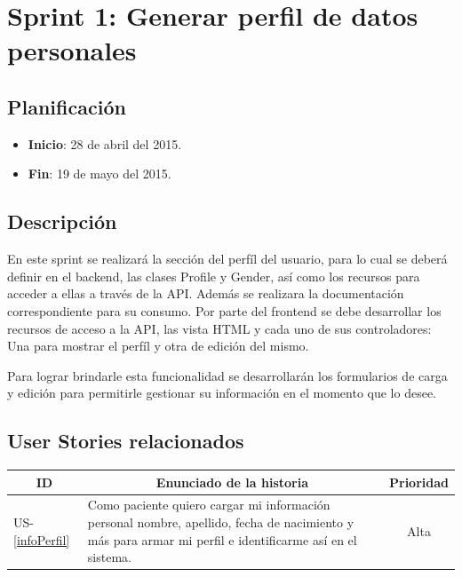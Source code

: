 \section{Sprint 1: Generar perfil de datos personales}

\subsection{Planificación}
\begin{itemize}
    \item \textbf{Inicio}: 28 de abril del 2015.
    \item \textbf{Fin}: 19 de mayo del 2015.
\end{itemize}

\subsection{Descripción}
En este sprint se realizará la sección del perfíl del usuario, para lo cual se deberá definir en el backend, las clases Profile y Gender, así como los recursos para acceder a ellas a través de la API. Además se realizara la documentación correspondiente para su consumo.
Por parte del frontend se debe desarrollar los recursos de acceso a la API, las vista HTML y cada uno de sus controladores: Una para mostrar el perfíl y otra de edición del mismo.

Para lograr brindarle esta funcionalidad se desarrollarán los formularios de carga y edición para permitirle gestionar su información en el momento que lo desee.

\subsection{User Stories relacionados}
{\scriptsize
\begin{table}[h]
	\begin{tabular}{|l|p{10cm}|c|}
	\hline
        \multicolumn{1}{|c|}{\textbf{ID}} &
        \multicolumn{1}{|c|}{\textbf{Enunciado de la historia}} &
        \textbf{Prioridad} \\     
    \hline
        US-\ref{infoPerfil} &
        Como paciente quiero cargar mi información personal nombre, apellido, fecha de nacimiento y más para armar mi perfil e identificarme así en el sistema.& Alta
        \\
    \hline 
	 \end{tabular}
\end{table}
}




